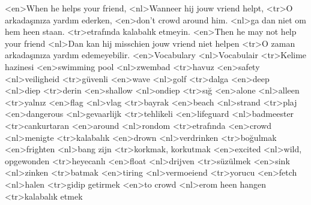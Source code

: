 <en>When he helps your friend,
<nl>Wanneer hij jouw vriend helpt,
<tr>O arkadaşınıza yardım ederken,
<en>don’t crowd around him.
<nl>ga dan niet om hem heen staan.
<tr>etrafında kalabalık etmeyin.
<en>Then he may not help your friend
<nl>Dan kan hij misschien jouw vriend niet helpen
<tr>O zaman arkadaşınıza yardım edemeyebilir.
<en>Vocabulary
<nl>Vocabulair
<tr>Kelime hazinesi
<en>swimming pool
<nl>zwembad
<tr>havuz
<en>safety
<nl>veiligheid
<tr>güvenli
<en>wave
<nl>golf
<tr>dalga
<en>deep
<nl>diep
<tr>derin
<en>shallow
<nl>ondiep
<tr>sığ
<en>alone
<nl>alleen
<tr>yalnız
<en>flag
<nl>vlag
<tr>bayrak
<en>beach
<nl>strand
<tr>plaj
<en>dangerous
<nl>gevaarlijk
<tr>tehlikeli
<en>lifeguard
<nl>badmeester
<tr>cankurtaran
<en>around
<nl>rondom
<tr>etrafında
<en>crowd
<nl>menigte
<tr>kalabalık
<en>drown
<nl>verdrinken
<tr>boğulmak
<en>frighten
<nl>bang zijn
<tr>korkmak, korkutmak
<en>excited
<nl>wild, opgewonden
<tr>heyecanlı
<en>float
<nl>drijven
<tr>süzülmek
<en>sink
<nl>zinken
<tr>batmak
<en>tiring
<nl>vermoeiend
<tr>yorucu
<en>fetch
<nl>halen
<tr>gidip getirmek
<en>to crowd
<nl>erom heen hangen
<tr>kalabalık etmek
